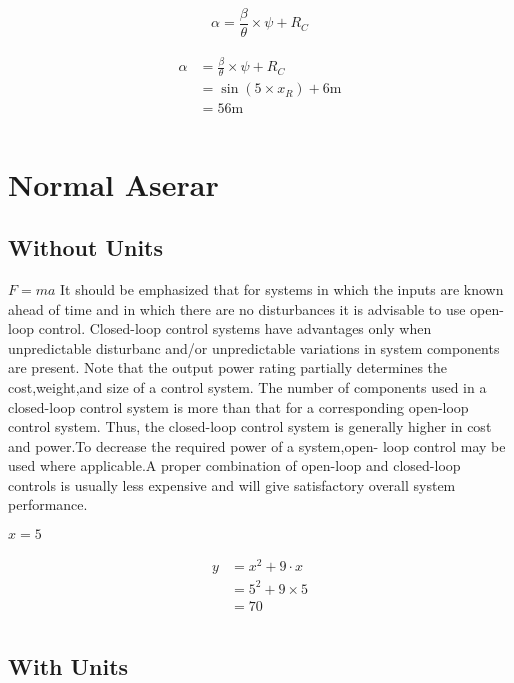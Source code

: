 \documentclass{report}
\begin{document}
\begin{equation}
\alpha = \frac{\beta}{\theta}\times\psi+R_C
\end{equation}

\begin{align}
\begin{split}
\alpha &= \frac{\beta}{\theta}\times\psi+R_C\\
&=\sin{\left(5\times x_R\right)} + 6\mathrm{m}\\
&=56\mathrm{m}\\
\end{split}
\end{align}

\chapter{Normal Aserar}
\section{Without Units}
$F = ma$ It should be emphasized that for systems in which the inputs are known ahead of time and in which there are no disturbances it is advisable to use open-loop control.  Closed-loop control systems have advantages only when unpredictable disturbanc  and/or unpredictable variations in system components are present. Note that the  output power rating partially determines the cost,weight,and size of a control system.  The number of components used in a closed-loop control system is more than that for  a corresponding open-loop control system. Thus, the closed-loop control system is generally higher in cost and power.To decrease the required power of a system,open-  loop control may be used where applicable.A proper combination of open-loop and  closed-loop controls is usually less expensive and will give satisfactory overall system  performance.

$x = 5$ 

\begin{align}
\begin{split}
y	&= x^{2} + 9 \cdot x\\
	&= 5^{2} + 9 \times 5\\
	&= 70\\
\end{split}
\end{align}

\section{With Units}
\end{document}
